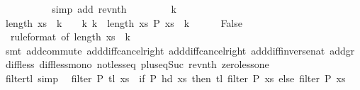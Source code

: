 \begin{isabellebody}
\ {\isacharasterisk}{\isacharparenleft}{}{\isacharparenright}\ {\isacharasterisk}{\isacharparenleft}{}{\isacharparenright}\isanewline
\ \ \ \ \ \ \isamarkupfalse%
\ {\isacharparenleft}simp\ add{\isacharcolon}\ rev{\isacharunderscore}nth{\isacharparenright}\isanewline
\ \ \isamarkupfalse%
\isanewline
\ \ \ \ \isamarkupfalse%
\ k{\isacharprime}\isanewline
\ \ \ \ \isamarkupfalse%
\ {\isachardoublequoteopen}length\ xs\ {\isacharminus}\ {\isacharparenleft}k\ {\isacharplus}\ {}{\isacharparenright}\ {\isacharless}\ k{\isacharprime}{\isachardoublequoteclose}\ {\isachardoublequoteopen}k{\isacharprime}\ {\isacharless}\ length\ xs{\isachardoublequoteclose}\ {\isachardoublequoteopen}P\ {\isacharparenleft}xs\ {\isacharbang}\ k{\isacharprime}{\isacharparenright}{\isachardoublequoteclose}\isanewline
\ \ \ \ \isamarkupfalse%
\ False\isanewline
\ \ \ \ \ \ \isamarkupfalse%
\ {\isacharasterisk}{\isacharparenleft}{}{\isacharparenright}\ {\isacharasterisk}{\isacharparenleft}{}{\isacharparenright}{\isacharbrackleft}rule{\isacharunderscore}format{\isacharcomma}\ of\ {\isachardoublequoteopen}length\ xs\ {\isacharminus}\ {\isacharparenleft}k{\isacharprime}\ {\isacharplus}\ {}{\isacharparenright}{\isachardoublequoteclose}{\isacharbrackright}\isanewline
\ \ \ \ \ \ \isamarkupfalse%
\ {\isacharparenleft}smt\ add{\isachardot}commute\ add{\isacharunderscore}diff{\isacharunderscore}cancel{\isacharunderscore}right\ add{\isacharunderscore}diff{\isacharunderscore}cancel{\isacharunderscore}right{\isacharprime}\ add{\isacharunderscore}diff{\isacharunderscore}inverse{\isacharunderscore}nat\ add{\isacharunderscore}gr{\isacharunderscore}{}\ diff{\isacharunderscore}less\ diff{\isacharunderscore}less{\isacharunderscore}mono{}\ not{\isacharunderscore}less{\isacharunderscore}eq\ plus{\isacharunderscore}{}{\isacharunderscore}eq{\isacharunderscore}Suc\ rev{\isacharunderscore}nth\ zero{\isacharunderscore}less{\isacharunderscore}one{\isacharparenright}\isanewline
\ \ \isamarkupfalse%
\ \ \ \ \isanewline
{}\isamarkupfalse%
%
\endisatagproof
{\isafoldproof}%
%
\isadelimproof
\isanewline
%
\endisadelimproof
\isanewline
{}\isamarkupfalse%
\ filter{\isacharunderscore}tl\ {\isacharbrackleft}simp{\isacharbrackright}{\isacharcolon}\isanewline
\ \ {\isachardoublequoteopen}filter\ P\ {\isacharparenleft}tl\ xs{\isacharparenright}\ {\isacharequal}\ {\isacharparenleft}if\ P\ {\isacharparenleft}hd\ xs{\isacharparenright}\ then\ tl\ {\isacharparenleft}filter\ P\ xs{\isacharparenright}\ else\ filter\ P\ xs{\isacharparenright}{\isachardoublequoteclose}\isanewline

\end{isabellebody}
